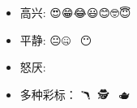\documentclass{article}
\begin{document}

  \begin{itemize}
    \item 高兴: {\emoji 😍😁😂😃😊🤓😇}
    \item 平静: {\emoji 😐🤐🥶🥸😬😶}
    \item 怒厌: {\emoji 🙁🤨🥱😠😱😿😈😭}
    \item 多种彩标：{\emoji 🎉🪃🦩🐮🕵️🧑🔬🍍🫖🐰💖🧑🦳👹}
  \end{itemize}  
\end{document}
